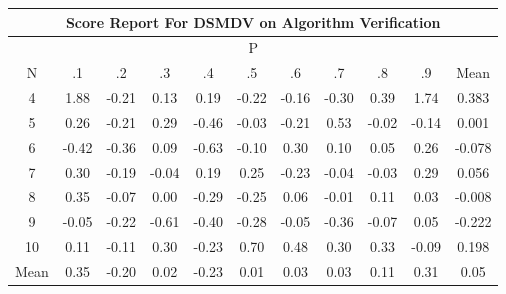 \documentclass[11pt,a4paper]{report}
\begin{document}
\begin{longtable}{ | c || c | c | c | c | c | c | c | c | c || c |}
\hline
\multicolumn{11}{|c|}{ Score Report For DSMDV on Algorithm Verification} \\
\hline
\multicolumn{11}{|c|}{ P } \\
\hline
N & .1 & .2 & .3 & .4 & .5 & .6 & .7 & .8 & .9 & Mean\\
 \hline
 \hline
 \endhead
  4 &  \cellcolor[HTML]{CFCFFF} 1.88 &  \cellcolor[HTML]{FFF7F7} -0.21 &  \cellcolor[HTML]{FFFFFF} 0.13 &  \cellcolor[HTML]{F7F7FF} 0.19 &  \cellcolor[HTML]{FFF7F7} -0.22 &  \cellcolor[HTML]{FFFFFF} -0.16 &  \cellcolor[HTML]{FFF7F7} -0.30 &  \cellcolor[HTML]{F7F7FF} 0.39 &  \cellcolor[HTML]{D7D7FF} 1.74 & 0.383 \\
  5 &  \cellcolor[HTML]{F7F7FF} 0.26 &  \cellcolor[HTML]{FFF7F7} -0.21 &  \cellcolor[HTML]{F7F7FF} 0.29 &  \cellcolor[HTML]{FFF7F7} -0.46 &  \cellcolor[HTML]{FFFFFF} -0.03 &  \cellcolor[HTML]{FFF7F7} -0.21 &  \cellcolor[HTML]{EFEFFF} 0.53 &  \cellcolor[HTML]{FFFFFF} -0.02 &  \cellcolor[HTML]{FFFFFF} -0.14 & 0.001 \\
  6 &  \cellcolor[HTML]{FFF7F7} -0.42 &  \cellcolor[HTML]{FFF7F7} -0.36 &  \cellcolor[HTML]{FFFFFF} 0.09 &  \cellcolor[HTML]{FFEFEF} -0.63 &  \cellcolor[HTML]{FFFFFF} -0.10 &  \cellcolor[HTML]{F7F7FF} 0.30 &  \cellcolor[HTML]{FFFFFF} 0.10 &  \cellcolor[HTML]{FFFFFF} 0.05 &  \cellcolor[HTML]{F7F7FF} 0.26 & -0.078 \\
  7 &  \cellcolor[HTML]{F7F7FF} 0.30 &  \cellcolor[HTML]{FFF7F7} -0.19 &  \cellcolor[HTML]{FFFFFF} -0.04 &  \cellcolor[HTML]{F7F7FF} 0.19 &  \cellcolor[HTML]{F7F7FF} 0.25 &  \cellcolor[HTML]{FFF7F7} -0.23 &  \cellcolor[HTML]{FFFFFF} -0.04 &  \cellcolor[HTML]{FFFFFF} -0.03 &  \cellcolor[HTML]{F7F7FF} 0.29 & 0.056 \\
  8 &  \cellcolor[HTML]{F7F7FF} 0.35 &  \cellcolor[HTML]{FFFFFF} -0.07 &  \cellcolor[HTML]{FFFFFF} 0.00 &  \cellcolor[HTML]{FFF7F7} -0.29 &  \cellcolor[HTML]{FFF7F7} -0.25 &  \cellcolor[HTML]{FFFFFF} 0.06 &  \cellcolor[HTML]{FFFFFF} -0.01 &  \cellcolor[HTML]{FFFFFF} 0.11 &  \cellcolor[HTML]{FFFFFF} 0.03 & -0.008 \\
  9 &  \cellcolor[HTML]{FFFFFF} -0.05 &  \cellcolor[HTML]{FFF7F7} -0.22 &  \cellcolor[HTML]{FFEFEF} -0.61 &  \cellcolor[HTML]{FFF7F7} -0.40 &  \cellcolor[HTML]{FFF7F7} -0.28 &  \cellcolor[HTML]{FFFFFF} -0.05 &  \cellcolor[HTML]{FFF7F7} -0.36 &  \cellcolor[HTML]{FFFFFF} -0.07 &  \cellcolor[HTML]{FFFFFF} 0.05 & -0.222 \\
  10 &  \cellcolor[HTML]{FFFFFF} 0.11 &  \cellcolor[HTML]{FFFFFF} -0.11 &  \cellcolor[HTML]{F7F7FF} 0.30 &  \cellcolor[HTML]{FFF7F7} -0.23 &  \cellcolor[HTML]{EFEFFF} 0.70 &  \cellcolor[HTML]{EFEFFF} 0.48 &  \cellcolor[HTML]{F7F7FF} 0.30 &  \cellcolor[HTML]{F7F7FF} 0.33 &  \cellcolor[HTML]{FFFFFF} -0.09 & 0.198 \\
 \hline
 \hline
Mean &  \cellcolor[HTML]{F7F7FF} 0.35 &  \cellcolor[HTML]{FFF7F7} -0.20 &  \cellcolor[HTML]{FFFFFF} 0.02 &  \cellcolor[HTML]{FFF7F7} -0.23 &  \cellcolor[HTML]{FFFFFF} 0.01 &  \cellcolor[HTML]{FFFFFF} 0.03 &  \cellcolor[HTML]{FFFFFF} 0.03 &  \cellcolor[HTML]{FFFFFF} 0.11 &  \cellcolor[HTML]{F7F7FF} 0.31 &  \cellcolor[HTML]{FFFFFF} 0.05
\end{longtable}
\end{document}

